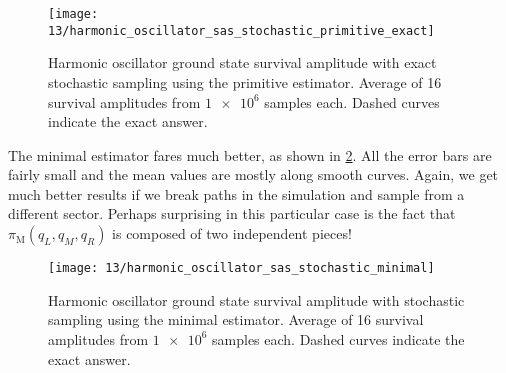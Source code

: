 \begin{figure}
	\centering
	\texttt{[image: 13/harmonic\_oscillator\_sas\_stochastic\_primitive\_exact]}
	\caption[
		Harmonic oscillator survival amplitude using primitive estimator (exact sampling)
	]{
		Harmonic oscillator ground state survival amplitude with exact stochastic sampling using the primitive estimator.
		Average of 16 survival amplitudes from $\num{1e6}$ samples each.
		Dashed curves indicate the exact answer.
	}
	\label{fig:harmonic-oscillator-survival-primitive-exact}
\end{figure}

The minimal estimator fares much better, as shown in \cref{fig:harmonic-oscillator-survival-minimal}.
All the error bars are fairly small and the mean values are mostly along smooth curves.
Again, we get much better results if we break paths in the simulation and sample from a different sector.
Perhaps surprising in this particular case is the fact that $\pi_\mathrm{M}(q_L, q_M, q_R)$ is composed of two independent pieces!

\begin{figure}
	\centering
	\texttt{[image: 13/harmonic\_oscillator\_sas\_stochastic\_minimal]}
	\caption[
		Harmonic oscillator survival amplitude using minimal estimator
	]{
		Harmonic oscillator ground state survival amplitude with stochastic sampling using the minimal estimator.
		Average of 16 survival amplitudes from $\num{1e6}$ samples each.
		Dashed curves indicate the exact answer.
	}
	\label{fig:harmonic-oscillator-survival-minimal}
\end{figure}
